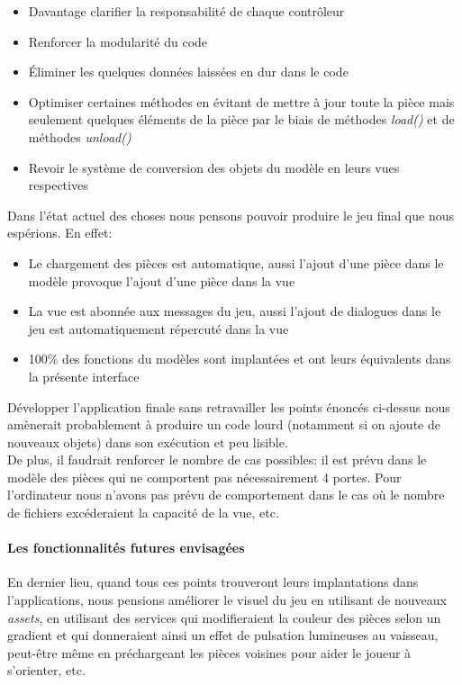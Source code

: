 \documentclass[./standalone.tex]{subfiles}
\begin{document}
\begin{itemize}
	\item Davantage clarifier la responsabilité de chaque contrôleur
	\item Renforcer la modularité du code
	\item Éliminer les quelques données laissées en dur dans le code
	\item Optimiser certaines méthodes en évitant de mettre à jour toute la pièce mais seulement quelques éléments de la pièce par le biais de méthodes \textit{load()} et de méthodes \textit{unload()}
	\item Revoir le système de conversion des objets du modèle en leurs vues respectives\\
\end{itemize}

Dans l'état actuel des choses nous pensons pouvoir produire le jeu final que nous espérions. En effet:

\begin{itemize}
	\item Le chargement des pièces est automatique, aussi l'ajout d'une pièce dans le modèle provoque l'ajout d'une pièce dans la vue
	\item La vue est abonnée aux messages du jeu, aussi l'ajout de dialogues dans le jeu est automatiquement répercuté dans la vue
	\item 100\% des fonctions du modèles sont implantées et ont leurs équivalents dans la présente interface\\
\end{itemize}

Développer l'application finale sans retravailler les points énoncés ci-dessus nous amènerait probablement à produire un code lourd (notamment si on ajoute de nouveaux objets) dans son exécution et peu lisible.\\

De plus, il faudrait renforcer le nombre de cas possibles: il est prévu dans le modèle des pièces qui ne comportent pas nécessairement 4 portes. Pour l'ordinateur nous n'avons pas prévu de comportement dans le cas où le nombre de fichiers excéderaient la capacité de la vue, etc.\\

\paragraph{Les fonctionnalités futures envisagées\\}
En dernier lieu, quand tous ces points trouveront leurs implantations dans l'applications, nous pensions améliorer le visuel du jeu en utilisant de nouveaux \textit{assets}, en utilisant des services qui modifieraient la couleur des pièces selon un gradient et qui donneraient ainsi un effet de pulsation lumineuses au vaisseau, peut-être même en préchargeant les pièces voisines pour aider le joueur à s'orienter, etc.\\
\end{document}
